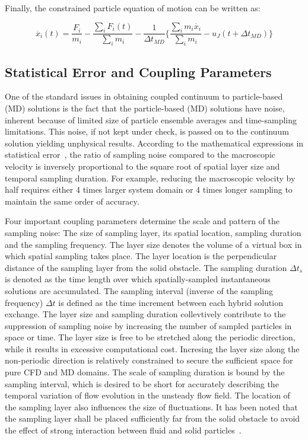 \documentclass[preprint,12pt]{elsarticle}
\begin{document}
Finally, the constrained particle equation of motion can be written as:


\vspace{-.2em}
\begin{equation}
 \ddot{x_{i}}(t) = \frac{F_{i}}{m_{i}} -  \frac{\displaystyle\sum_{i}F_{i}(t)} {\displaystyle\sum_{i}m_{i}} - \frac{1}{\Delta t_{MD}} \{  \frac{\displaystyle\sum_{i}m_{i}\dot{x_{i}}} {\displaystyle\sum_{i}m_{i}} - u_{J}(t + \Delta t_{MD})\}
 \label{eq:Con3}
\end{equation}
\normalsize



\subsection{Statistical Error and Coupling Parameters}
\label{sec:numerical_noise}

One of the standard issues in obtaining coupled continuum to particle-based (MD) solutions is the fact that the particle-based (MD) solutions have noise, inherent because of limited size of particle ensemble averages and time-sampling limitations. This noise, if not kept under check, is passed on to the continuum solution yielding unphysical results. According to the mathematical expressions in statistical error~\cite{Hadjicon3,Time_Mechanism}, the ratio of sampling noise compared to the macroscopic velocity is inversely proportional to the square root of spatial layer size and temporal sampling duration. For example, reducing the macroscopic velocity by half requires either 4 times larger system domain or 4 times longer sampling to maintain the same order of accuracy. 

Four important coupling parameters determine the scale and pattern of
the sampling noise: The size of sampling layer, its spatial location,
sampling duration and the sampling frequency.
The layer size denotes the volume of a virtual box in which spatial sampling
takes place. The layer location is the perpendicular distance of the sampling
layer from the solid obstacle. The sampling duration ${\Delta}{t_s}$ is denoted as
the time length over which spatially-sampled instantaneous solutions are
accumulated. The sampling interval (inverse of the sampling frequency)
${\Delta}t$ is defined as the time increment between each
hybrid solution exchange.  The layer size and sampling duration
collevtively contribute to the suppression of sampling noise
by increasing the number of sampled particles in space or time.
The layer size is free to be stretched along the periodic direction,
while it results in excessive computational cost. Incresing the layer size
along the non-periodic direction is relatively constrained to secure
the sufficient space for pure CFD and MD domains.
The scale of sampling duration is bound by the sampling interval, which is
desired to be short for accurately describing the temporal variation of 
flow evolution in the unsteady flow field.
The location of the sampling layer also influences the size of fluctuations.
It has been noted that the sampling layer shall be placed sufficiently
far from the solid obstacle to avoid the effect of strong interaction
between fluid and solid particles~\cite{Nie,Yen}.
\end{document}
